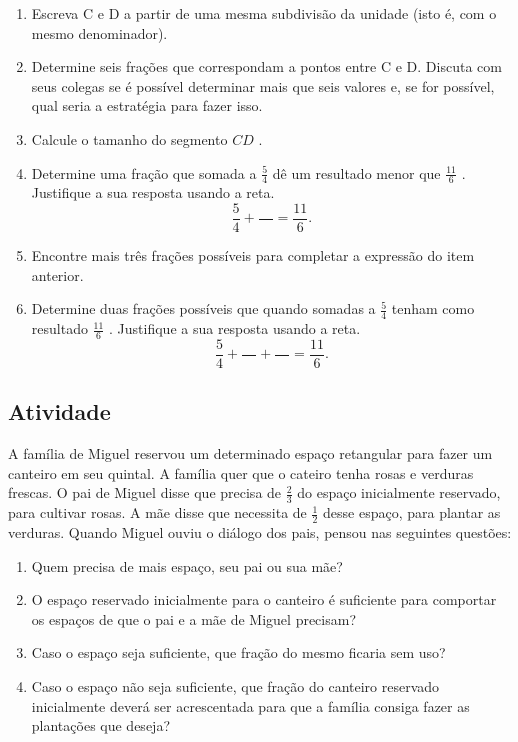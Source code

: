 \begin{enumerate} [\quad a)] %
  \item     Escreva C e D a partir de uma mesma subdivisão da unidade (isto é, com o mesmo denominador).
  \item     Determine seis frações que correspondam a pontos entre C e D.     \mbox{} \newline      Discuta com seus colegas se é possível determinar mais que seis valores e, se for possível, qual seria a estratégia para fazer isso.
  \item     Calcule o tamanho do segmento     $CD$    .
  \item     Determine uma fração que somada a     $\frac{5}{4}$     dê um resultado menor que     $\frac{11}{6}$    . Justifique a sua resposta usando a reta.     $$ \dfrac{5}{4} +\dfrac{\quad}{} = \dfrac{11}{6}.$$     
  \item     Encontre mais três frações possíveis para completar a expressão do item anterior. 
  \item     Determine duas frações possíveis que quando somadas a     $\frac{5}{4}$     tenham como resultado     $\frac{11}{6}$    . Justifique a sua resposta usando a reta.     $$ \dfrac{5}{4} +\dfrac{\quad}{} + \dfrac{\quad}{} = \dfrac{11}{6}.$$     
\end{enumerate} %

\subsection{Atividade}

A família de Miguel reservou um determinado espaço retangular para fazer um canteiro em seu quintal. A família quer que o cateiro tenha rosas e verduras frescas. O pai de Miguel disse que precisa de $\frac{2}{3}$ do espaço inicialmente reservado, para cultivar rosas. A mãe disse que necessita de $\frac{1}{2}$ desse espaço, para plantar as verduras. Quando Miguel ouviu o diálogo dos pais, pensou nas seguintes questões:
\begin{enumerate} [\quad a)] %
  \item     Quem precisa de mais espaço, seu pai ou sua mãe? 
  \item     O espaço reservado inicialmente para o canteiro é suficiente para comportar os espaços de que o pai e a mãe de Miguel precisam? 
  \item     Caso o espaço seja suficiente, que fração do mesmo ficaria sem uso? 
  \item     Caso o espaço não seja suficiente, que fração do canteiro reservado inicialmente deverá ser acrescentada para que a família consiga fazer as plantações que deseja? 
\end{enumerate} %


